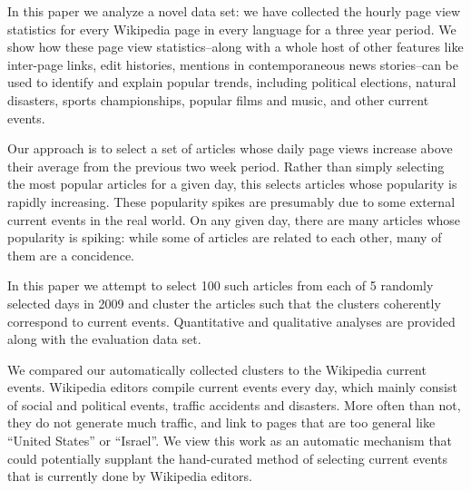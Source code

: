 \documentclass[11pt]{article}
\begin{document}

In this paper we analyze a novel data set: we have collected the hourly page view statistics for every Wikipedia page in every language for a three year period.
We show how these page view statistics--along with a whole host of other features like inter-page links, edit histories, mentions in contemporaneous news stories--can be used to identify and explain popular trends, including political elections, natural disasters, sports championships, popular films and music, and other current events.

Our approach is to select a set of articles whose daily page views increase above their average from the previous two week period.
Rather than simply selecting the most popular articles for a given day, this selects articles whose popularity is rapidly increasing.
These popularity spikes are presumably due to some external current events in the real world.
On any given day, there are many articles whose popularity is spiking:
while some of articles are related to each other, many of them are a concidence.

In this paper we attempt to select 100 such articles from each of 5 randomly selected days in 2009
and cluster the articles such that the clusters coherently correspond to current events.
Quantitative and qualitative analyses are provided along with the evaluation data set.

We compared our automatically collected clusters to the Wikipedia current events.
Wikipedia editors compile current events every day, which mainly consist of social and political events,
traffic accidents and disasters. More often than not, they do not generate much traffic,
and link to pages that are too general like ``United States'' or ``Israel''.
We view this work as an automatic mechanism that could potentially supplant
the hand-curated method of selecting current events that is currently done by Wikipedia editors.
\end{document}
